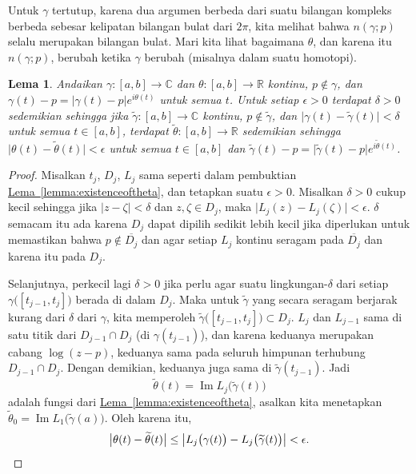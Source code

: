 \documentclass[12pt,openany]{book}
\renewcommand{\Im}{\operatorname{Im}}
\newcommand{\sabs}[1]{\lvert {#1} \rvert}
\newcommand{\babs}[1]{\bigl\lvert {#1} \bigr\rvert}
\newcommand{\C}{{\mathbb{C}}}
\newcommand{\R}{{\mathbb{R}}}
\theoremstyle{plain}
\newtheorem{lemma}[thm]{Lema}
\theoremstyle{remark}
\theoremstyle{definition}
\theoremstyle{exercise}
\theoremstyle{example}
\newcommand{\lemmaref}[1]{\hyperref[#1]{Lema~\ref*{#1}}}
\begin{document}
Untuk $\gamma$ tertutup, karena dua argumen berbeda dari suatu bilangan kompleks berbeda sebesar
kelipatan bilangan bulat dari $2 \pi$, kita melihat bahwa $n(\gamma;p)$ selalu merupakan bilangan bulat.
Mari kita lihat bagaimana $\theta$, dan karena itu $n(\gamma;p)$, berubah 
ketika $\gamma$ berubah (misalnya dalam suatu homotopi).

\begin{lemma} \label{lemma:changeintheta}
Andaikan $\gamma \colon [a,b] \to \C$ dan $\theta \colon [a,b] \to \R$
kontinu, $p \notin \gamma$,
dan $\gamma(t)-p = \sabs{\gamma(t)-p} e^{i\theta(t)}$ untuk semua $t$.
Untuk setiap $\epsilon > 0$ terdapat $\delta > 0$ sedemikian sehingga
jika $\widetilde{\gamma} \colon [a,b] \to \C$ kontinu,
$p \notin \widetilde{\gamma}$, dan
$\sabs{\gamma(t)-\widetilde{\gamma}(t)} < \delta$ untuk semua $t \in [a,b]$,
terdapat $\widetilde{\theta} \colon [a,b] \to \R$ sedemikian sehingga
$\sabs{\theta(t)-\widetilde{\theta}(t)} < \epsilon$ untuk semua $t \in [a,b]$
dan $\widetilde{\gamma}(t)-p = \sabs{\widetilde{\gamma}(t)-p}
e^{i\widetilde{\theta}(t)}$.
\end{lemma}

\begin{proof}
Misalkan $t_j$, $D_j$, $L_j$ sama seperti dalam pembuktian
\lemmaref{lemma:existenceoftheta}, dan tetapkan suatu $\epsilon > 0$.
Misalkan $\delta > 0$ cukup kecil sehingga jika $\sabs{z-\zeta}
< \delta$ dan $z,\zeta \in D_j$, maka $\sabs{L_j(z)-L_j(\zeta)} < \epsilon$.
$\delta$ semacam itu ada karena $D_j$ dapat dipilih sedikit lebih kecil jika diperlukan
untuk memastikan bahwa $p \notin \overline{D_j}$ dan agar setiap $L_j$
kontinu seragam pada $\overline{D_j}$ dan karena itu pada $D_j$.

Selanjutnya, perkecil lagi $\delta > 0$ jika perlu agar suatu lingkungan-$\delta$ dari setiap
$\gamma\bigl([t_{j-1},t_j]\bigr)$ berada di dalam $D_j$. Maka
untuk $\widetilde{\gamma}$ yang secara seragam berjarak kurang dari $\delta$ dari $\gamma$, kita
memperoleh
$\widetilde{\gamma}\bigl([t_{j-1},t_j]\bigr) \subset D_j$.
$L_j$ dan $L_{j-1}$ sama di satu titik dari $D_{j-1} \cap D_j$ (di
$\gamma(t_{j-1})$), dan karena keduanya merupakan cabang $\log (z-p)$, keduanya
sama pada seluruh himpunan terhubung $D_{j-1} \cap D_j$. Dengan demikian, keduanya juga
sama di $\widetilde{\gamma}(t_{j-1})$.
Jadi
\begin{equation*}
\widetilde{\theta}(t)
=
\Im L_j\bigl(\widetilde{\gamma}(t)\bigr)
\end{equation*}
adalah fungsi dari \lemmaref{lemma:existenceoftheta}, asalkan kita menetapkan
$\widetilde{\theta}_0 = \Im L_1\bigl(\widetilde{\gamma}(a)\bigr)$.
Oleh karena itu,
\begin{equation*}
\babs{\theta(t) - \widetilde{\theta}(t)}
\leq
\babs{
L_j\bigl(\gamma(t)\bigr)
-
L_j\bigl(\widetilde{\gamma}(t)\bigr)
}
< \epsilon. \qedhere
\end{equation*}
\end{proof}
\end{document}
